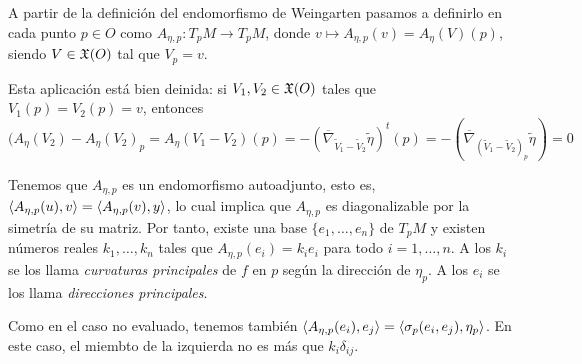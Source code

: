 \documentclass[GSR.tex]{subfiles}
\begin{document}
A partir de la definición del endomorfismo de Weingarten pasamos a definirlo en cada punto $p\in O$ como $A_{\eta,p}:T_pM\to T_pM$, donde $v\mapsto A_{\eta,p}(v)=A_\eta(V)(p)$, siendo $V\in{\mathfrak{X}}(O)$ tal que $V_p=v$. 

Esta aplicación está bien deinida: si $V_1,V_2\in{\mathfrak{X}}(O)$ tales que $V_1(p)=V_2(p)=v$, entonces 
\[
(A_\eta(V_2)-A_\eta(V_2)_p=A_\eta(V_1-V_2)(p)=-(\overline{\nabla}_{\tilde{V}_1-\tilde{V}_2}\tilde{\eta})^t(p)=-(\overline{\nabla}_{(\tilde{V}_1-\tilde{V}_2)_p}\tilde{\eta})=0
\]

Tenemos que $A_{\eta,p}$ es un endomorfismo autoadjunto, esto es, $\langle{A_{\eta,p}(u),v}\rangle=\langle{A_{\eta,p}(v),y}\rangle$, lo cual implica que $A_{\eta,p}$ es diagonalizable por la simetría de su matriz. Por tanto, existe una base $\{e_1,\dots, e_n\}$ de $T_pM$ y existen números reales $k_1,\dots, k_n$ tales que $A_{\eta,p}(e_i)=k_ie_i$ para todo $i=1,\dots, n$. A los $k_i$ se los llama \emph{curvaturas principales} de $f$ en $p$ según la dirección de $\eta_p$. A los $e_i$ se los llama \emph{direcciones principales}. 

Como en el caso no evaluado, tenemos también $\langle{A_{\eta,p}(e_i),e_j}\rangle=\langle{\sigma_p(e_i,e_j),\eta_p}\rangle$. En este caso, el miembto de la izquierda no es más que $k_i\delta_{ij}$. 
\end{document}
